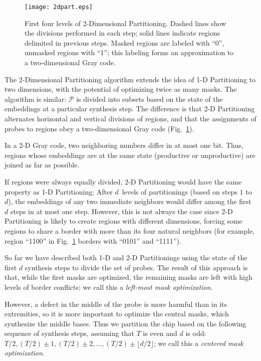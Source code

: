 \begin{figure}[t]\centering
\texttt{[image: 2dpart.eps]}
\caption{\label{fig:2dpart}%
  First four levels of 2-Dimensional Partitioning. Dashed lines show
  the divisions performed in each step; solid lines indicate regions
  delimited in previous steps. Masked regions are labeled with ``0'',
  unmasked regions with ``1''; this labeling forms an approximation to
  a two-dimensional Gray code.}%
\end{figure}

The 2-Dimensional Partitioning algorithm extends the idea of 1-D
Partitioning to two dimensions, with the potential of optimizing twice
as many masks. The algorithm is similar: $\mathcal{P}$ is divided into
subsets based on the state of the embeddings at a particular
synthesis step. The difference is that 2-D Partitioning alternates
horizontal and vertical divisions of regions, and that the assignments
of probes to regions obey a two-dimensional Gray code
(Fig.~\ref{fig:2dpart}).

In a 2-D Gray code, two neighboring numbers differ in at most one
bit.  Thus, regions whose embeddings are at the same state (productive or
unproductive) are joined as far as possible.

If regions were always equally divided, 2-D Partitioning would have
the same property as 1-D Partitioning: After $d$~levels of
partitionings (based on steps $1$ to $d$), the embeddings of any two
immediate neighbors would differ among the first $d$ steps in at most
one step. However, this is not always the case since 2-D Partitioning
is likely to create regions with different dimensions, forcing some
regions to share a border with more than its four natural neighbors
(for example, region ``1100'' in Fig.~\ref{fig:2dpart} borders with
``0101'' and ``1111'').

So far we have described both 1-D and 2-D Partitionings using the
state of the first $d$ synthesis steps to divide the set of probes.
The result of this approach is that, while the first masks are
optimized, the remaining masks are left with high levels of border
conflicts; we call this a \emph{left-most mask optimization}.

However, a defect in the middle of the probe is more harmful than in
its extremities, so it is more important to optimize the central masks,
which synthesize the middle bases. Thus we
partition the chip based on the following sequence
of synthesis steps, assuming that $T$ is even and $d$ is odd: $T/2,
(T/2)\pm 1, (T/2)\pm 2, \dots, (T/2)\pm\lfloor d/2\rfloor$; we call
this a \emph{centered mask optimization}.


